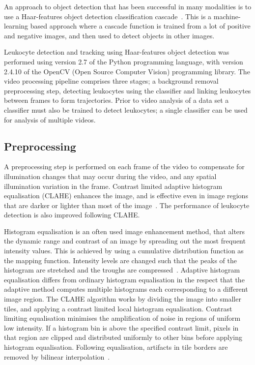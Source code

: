 An approach to object detection that has been successful in many modalities is to use a Haar-features object detection classification cascade~\cite{Lienhart2002}. This is a machine-learning based approach where a cascade function is trained from a lot of positive and negative images, and  then used to detect objects in other images. 

Leukocyte detection and tracking using Haar-features object detection was performed using version 2.7 of the Python programming language, with version 2.4.10 of the OpenCV (Open Source Computer Vision) programming library. The video processing pipeline comprises three stages; a background removal preprocessing step, detecting leukocytes using the classifier and linking leukocytes between frames to form trajectories. Prior to video analysis of a data set a classifier must also be trained to detect leukocytes; a single classifier can be used for analysis of multiple videos.

\subsection{Preprocessing}
\label{leukocytes:processing:preprocessing}
A preprocessing step is performed on each frame of the video to compensate for illumination changes that may occur during the video, and any spatial illumination variation in the frame. Contrast limited adaptive histogram equalisation (CLAHE) enhances the image, and is effective even in image regions that are darker or lighter than most of the image~\cite{Ketcham1974}. The performance of leukocyte detection is also improved following CLAHE.

Histogram equalisation is an often used image enhancement method, that alters the dynamic range and contrast of an image by spreading out the most frequent intensity values. This is achieved by using a cumulative distribution function as the mapping function. Intensity levels are changed such that the peaks of the histogram are stretched and the troughs are compressed~\cite{Sasi2013}. Adaptive histogram equalisation differs from ordinary histogram equalisation in the respect that the adaptive method computes multiple histograms each corresponding to a different image region. The CLAHE algorithm works by dividing the image into smaller tiles, and applying a contrast limited local histogram equalisation. Contrast limiting equalisation minimises the amplification of noise in regions of uniform low intensity. If a histogram bin is above the specified contrast limit, pixels in that region are clipped and distributed uniformly to other bins before applying histogram equalisation. Following equalisation, artifacts in tile borders are removed by bilinear interpolation~\cite{Hummel1977}.

